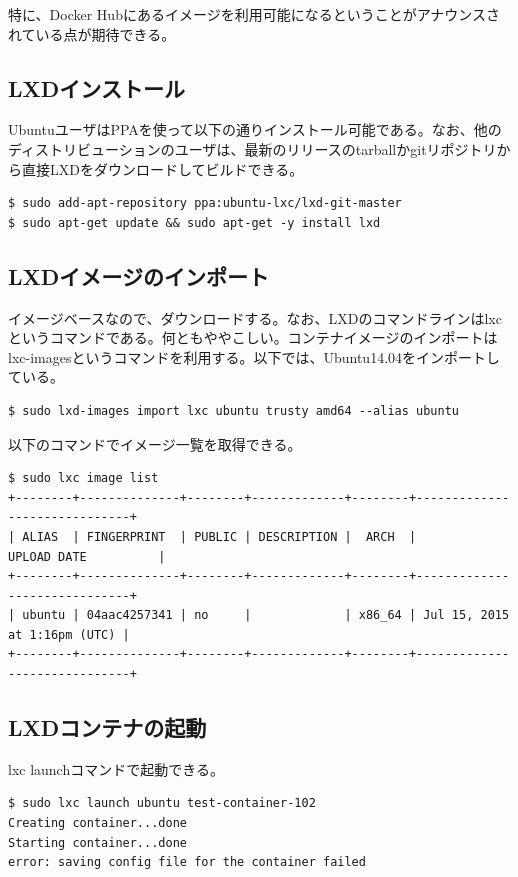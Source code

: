 ﻿\documentclass[9pt,b5paper,tombo,openany]{jsbook}
\begin{document}
\noindent
特に、Docker Hubにあるイメージを利用可能になるということがアナウンスされている点が期待できる。


\subsection{LXDインストール}
UbuntuユーザはPPAを使って以下の通りインストール可能である。なお、他のディストリビューションのユーザは、最新のリリースのtarballかgitリポジトリから直接LXDをダウンロードしてビルドできる。
\begin{lstlisting}
$ sudo add-apt-repository ppa:ubuntu-lxc/lxd-git-master
$ sudo apt-get update && sudo apt-get -y install lxd
\end{lstlisting}

\subsection{LXDイメージのインポート}
イメージベースなので、ダウンロードする。なお、LXDのコマンドラインはlxcというコマンドである。何ともややこしい。コンテナイメージのインポートはlxc-imagesというコマンドを利用する。以下では、Ubuntu14.04をインポートしている。

\begin{lstlisting}
$ sudo lxd-images import lxc ubuntu trusty amd64 --alias ubuntu
\end{lstlisting}

\noindent
以下のコマンドでイメージ一覧を取得できる。
\begin{lstlisting}
$ sudo lxc image list
+--------+--------------+--------+-------------+--------+------------------------------+
| ALIAS  | FINGERPRINT  | PUBLIC | DESCRIPTION |  ARCH  |         UPLOAD DATE          |
+--------+--------------+--------+-------------+--------+------------------------------+
| ubuntu | 04aac4257341 | no     |             | x86_64 | Jul 15, 2015 at 1:16pm (UTC) |
+--------+--------------+--------+-------------+--------+------------------------------+
\end{lstlisting}

\newpage

\subsection{LXDコンテナの起動}
lxc launchコマンドで起動できる。
\begin{lstlisting}
$ sudo lxc launch ubuntu test-container-102
Creating container...done
Starting container...done
error: saving config file for the container failed
\end{lstlisting}
\end{document}
